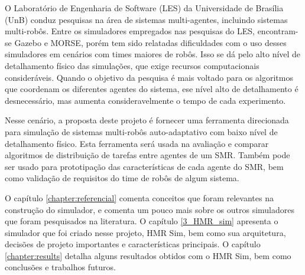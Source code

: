 O Laboratório de Engenharia de Software (LES) da Universidade de Brasília (UnB) conduz pesquisas na área de sistemas multi-agentes, incluindo sistemas multi-robôs. Entre os simuladores empregados nas pesquisas do LES, encontram-se Gazebo e MORSE, porém tem sido relatadas dificuldades com o uso desses simuladores em cenários com times maiores de robôs. Isso se dá pelo alto nível de detalhamento físico das simulações, que exige recursos computacionais consideráveis. Quando o objetivo da pesquisa é mais voltado para os algoritmos que coordenam os diferentes agentes do sistema, ese nível alto de detalhamento é desnecessário, mas aumenta consideravelmente o tempo de cada experimento.

Nesse cenário, a proposta deste projeto é fornecer uma ferramenta direcionada para simulação de sistemas multi-robôs auto-adaptativo com baixo nível de detalhamento físico. Esta ferramenta será usada na avaliação e comparar algoritmos de distribuição de tarefas entre agentes de um SMR. Também pode ser usado para prototipação das características de cada agente do SMR, bem como validação de requisitos do time de robôs de algum sistema.

O capítulo \ref{chapter:referencial} comenta conceitos que foram relevantes na construção do simulador, e comenta um pouco mais sobre os outros simuladores que foram pesquisados na literatura. O capítulo \ref{3_HMR_sim} apresenta o simulador que foi criado nesse projeto, HMR Sim, bem como sua arquitetura, decisões de projeto importantes e características principais. O capítulo \ref{chapter:results} detalha alguns resultados obtidos com o HMR Sim, bem como conclusões e trabalhos futuros.


